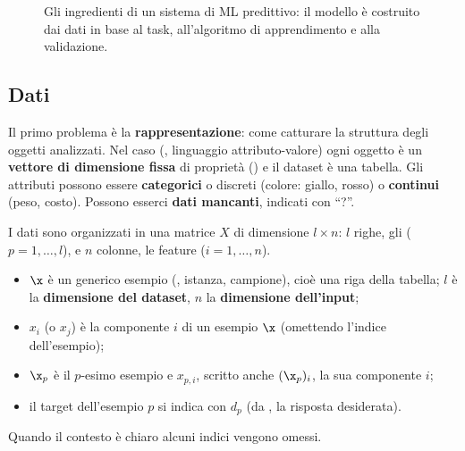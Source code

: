 \begin{figure}[ht]
\centering
{}
\caption{Gli ingredienti di un sistema di ML predittivo: il modello è costruito dai dati in base al task,
all'algoritmo di apprendimento e alla validazione.}
\label{fig:sistema-ml}
\end{figure}

\subsection{Dati}
\label{sec:dati}

Il primo problema è la \textbf{rappresentazione}: come catturare la struttura degli oggetti analizzati. Nel
caso  (, linguaggio attributo-valore) ogni oggetto è un \textbf{vettore di dimensione
fissa} di proprietà () e il dataset è una tabella. Gli attributi possono essere
\textbf{categorici} o discreti (colore: giallo, rosso) o \textbf{continui} (peso, costo). Possono esserci
\textbf{dati mancanti}, indicati con ``?''.

\begin{definizione}
I dati sono organizzati in una matrice $X$ di dimensione $l\times n$: $l$ righe, gli 
($p = 1,\dots,l$), e $n$ colonne, le feature ($i = 1,\dots,n$).
\begin{itemize}
  \item $\x$ è un generico esempio (, istanza, campione), cioè una riga della tabella;
        $l$ è la \textbf{dimensione del dataset}, $n$ la \textbf{dimensione dell'input};
  \item $x_i$ (o $x_j$) è la componente $i$ di un esempio $\x$ (omettendo l'indice dell'esempio);
  \item $\x_p$ è il $p$-esimo esempio e $x_{p,i}$, scritto anche $(\x_p)_i$, la sua componente $i$;
  \item il target dell'esempio $p$ si indica con $d_p$ (da , la risposta desiderata).
\end{itemize}
Quando il contesto è chiaro alcuni indici vengono omessi.
\end{definizione}

